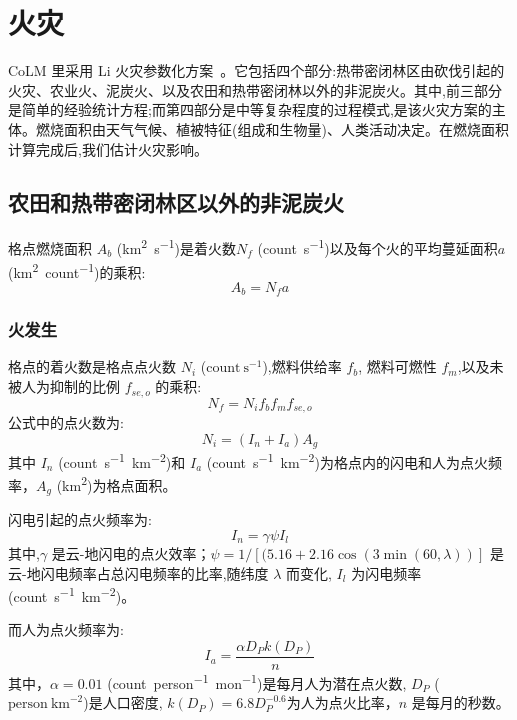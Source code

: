 \chapter{火灾}\label{ch:火灾}
CoLM 里采用 Li 火灾参数化方案~\citep{LiF2012,LiF2013,LiF2017,LiF2019}。它包括四个部分:热带密闭林区由砍伐引起的火灾、农业火、泥炭火、以及农田和热带密闭林以外的非泥炭火。其中,前三部分是简单的经验统计方程;而第四部分是中等复杂程度的过程模式,是该火灾方案的主体。燃烧面积由天气气候、植被特征(组成和生物量)、人类活动决定。在燃烧面积计算完成后,我们估计火灾影响。

\section{农田和热带密闭林区以外的非泥炭火}
格点燃烧面积 $A_b$ (\unit{km^2.s^{-1}})是着火数$N_f$ (\unit{count.s^{-1}})以及每个火的平均蔓延面积$a$ (\unit{km^2.count^{-1}})的乘积:
\begin{equation}
A_b = N_f a
\end{equation}

\subsection{火发生}
格点的着火数是格点点火数 $N_i$ ($\text{count}~\text{s}^{-1}$),燃料供给率 $f_b$, 燃料可燃性 $f_m$,以及未被人为抑制的比例 $f_{se,o}$ 的乘积:  
\begin{equation}
N_f = N_i f_b f_m f_{se,o} 
\end{equation}
%
公式中的点火数为:
\begin{equation}
N_{i}=\left(I_{n}+I_{a}\right) A_{g}
\end{equation}
%
其中 $I_n$ (\unit{count.s^{-1}.km^{-2}})和 $I_a$ (\unit{count.s^{-1}.km^{-2}})为格点内的闪电和人为点火频率，$A_g$ (\unit{km^2})为格点面积。

闪电引起的点火频率为: 
\begin{equation}
I_{n}=\gamma \psi I_{l}
\end{equation}
其中,$\gamma$ 是云-地闪电的点火效率；$\psi=1/\left[(5.16+2.16\cos(3\min(60,\lambda))\right]$ 是云-地闪电频率占总闪电频率的比率,随纬度 $\lambda$ 而变化, $I_{l}$ 为闪电频率 (\unit{count.s^{-1}.km^{-2}})。

而人为点火频率为:  
\begin{equation}
I_{a}=\frac{\alpha D_{P} k\left(D_{P}\right)}{n}
\end{equation}
其中，$\alpha=0.01$ (\unit{count.person^{-1}.mon^{-1}})是每月人为潜在点火数, $D_P$ ($\text{person}~\text{km}^{-2}$)是人口密度, $k\left(D_{P}\right)=6.8D_P^{-0.6}$为人为点火比率，$n$ 是每月的秒数。

